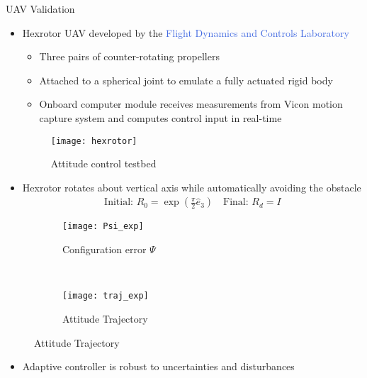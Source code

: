 \documentclass[final, usenames, dvipsnames]{beamer}
\newlength{\onecolwidth}
\def\Emph{\textcolor{RoyalBlue}}
\begin{document}
\begin{frame}[t]
\begin{columns}[T,onlytextwidth]
\begin{column}{\onecolwidth}
\begin{block}{UAV Validation} %
	\begin{itemize}
		\item Hexrotor UAV developed by the \Emph{Flight Dynamics and Controls Laboratory}
		\begin{itemize}
			\item Three pairs of counter-rotating propellers
			\item Attached to a spherical joint to emulate a fully actuated rigid body
			\item Onboard computer module receives measurements from Vicon motion capture system and computes control input in real-time
		\end{itemize}
		\vspace{0.35in}
    	\begin{figure}
    		\centering
    		\texttt{[image: hexrotor]}
    		\caption*{Attitude control testbed~\label{fig:hexrotor}}
    	\end{figure}
		\item Hexrotor rotates about vertical axis while automatically avoiding the obstacle
		\begin{align*}
			\text{Initial: } R_0 = \exp( \frac{\pi}{2} \hat{e}_3) \quad \text{Final: } R_d = I
		\end{align*}
	\end{itemize}
	\begin{figure} 
	\centering 
	\begin{subfigure}[htbp]{0.5\columnwidth} 
		\texttt{[image: Psi\_exp]} 
		\caption*{Configuration error \( \Psi \)} \label{fig:Psi_exp} 
	\end{subfigure}~
	\begin{subfigure}[htbp]{0.5\columnwidth} 
		\texttt{[image: traj\_exp]} 
		\caption*{Attitude Trajectory} \label{fig:traj_exp} 
	\end{subfigure}
	\end{figure}
	\begin{itemize}
		\item Adaptive controller is robust to uncertainties and disturbances 
	\end{itemize}
\end{block} %


\end{column}
\end{columns}
\end{frame}
\end{document}
